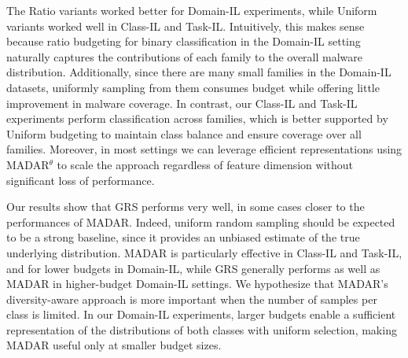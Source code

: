 The Ratio variants worked better for Domain-IL experiments, while Uniform variants worked well in Class-IL and Task-IL. Intuitively, this makes sense because ratio budgeting for binary classification in the Domain-IL setting naturally captures the contributions of each family to the overall malware distribution. Additionally, since there are many small families in the Domain-IL datasets, uniformly sampling from them consumes budget while offering little improvement in malware coverage. In contrast, our Class-IL and Task-IL experiments perform classification across families, which is better supported by Uniform budgeting to maintain class balance and ensure coverage over all families. Moreover, in most settings we can leverage efficient representations using MADAR$^\theta$ to scale the approach regardless of feature dimension without significant loss of performance.


Our results show that GRS performs very well, in some cases closer to the performances of MADAR. Indeed, uniform random sampling should be expected to be a strong baseline, since it provides an unbiased estimate of the true underlying distribution. MADAR is particularly effective in Class-IL and Task-IL, and for lower budgets in Domain-IL, while GRS generally performs as well as MADAR in higher-budget Domain-IL settings. We hypothesize that MADAR's diversity-aware approach is more important when the number of samples per class is limited. In our Domain-IL experiments, larger budgets enable a sufficient representation of the distributions of both classes with uniform selection, making MADAR useful only at smaller budget sizes. 
\fi 
















